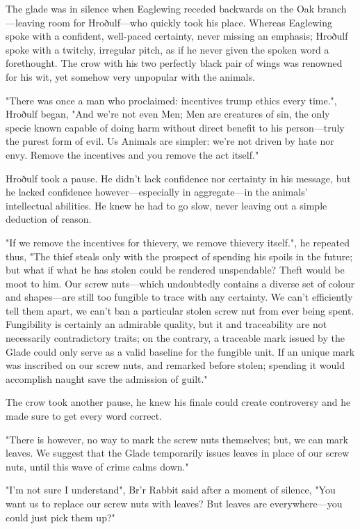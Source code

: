 

The glade was in silence when Eaglewing receded backwards on the Oak branch---leaving room for Hroðulf---who quickly took his place. Whereas Eaglewing spoke with a confident, well-paced certainty, never missing an emphasis; Hroðulf spoke with a twitchy, irregular pitch, as if he never given the spoken word a forethought. The crow with his two perfectly black pair of wings was renowned for his wit, yet somehow very unpopular with the animals.

"There was once a man who proclaimed: incentives trump ethics every time.", Hroðulf began, "And we're not even Men; Men are creatures of sin, the only specie known capable of doing harm without direct benefit to his person---truly the purest form of evil. Us Animals are simpler: we're not driven by hate nor envy. Remove the incentives and you remove the act itself."

Hroðulf took a pause. He didn't lack confidence nor certainty in his message, but he lacked confidence however---especially in aggregate---in the animals' intellectual abilities. He knew he had to go slow, never leaving out a simple deduction of reason.

"If we remove the incentives for thievery, we remove thievery itself.", he repeated thus, "The thief steals only with the prospect of spending his spoils in the future; but what if what he has stolen could be rendered unspendable? Theft would be moot to him. Our screw nuts---which undoubtedly contains a diverse set of colour and shapes---are still too fungible to trace with any certainty. We can't efficiently tell them apart, we can't ban a particular stolen screw nut from ever being spent. Fungibility is certainly an admirable quality, but it and traceability are not necessarily contradictory traits; on the contrary, a traceable mark issued by the Glade could only serve as a valid baseline for the fungible unit. If an unique mark was inscribed on our screw nuts, and remarked before stolen; spending it would accomplish naught save the admission of guilt."

The crow took another pause, he knew his finale could create controversy and he made sure to get every word correct.

"There is however, no way to mark the screw nuts themselves; but, we can mark leaves. We suggest that the Glade temporarily issues leaves in place of our screw nuts, until this wave of crime calms down."

"I'm not sure I understand", Br'r Rabbit said after a moment of silence, "You want us to replace our screw nuts with leaves? But leaves are everywhere---you could just pick them up?"

